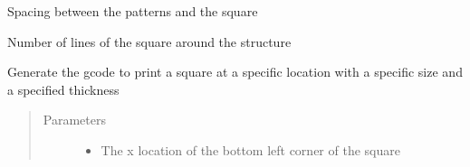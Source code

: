 \documentclass[letterpaper,10pt,english]{sphinxmanual}
\begin{document}
\begin{fulllineitems}
\begin{fulllineitems}
\end{fulllineitems}


\begin{fulllineitems}
\label{\detokenize{index:calibration_pattern.calibration_pattern.spacing_to_square}}
\sphinxAtStartPar
Spacing between the patterns and the square

\end{fulllineitems}


\begin{fulllineitems}
\label{\detokenize{index:calibration_pattern.calibration_pattern.square_lines}}
\sphinxAtStartPar
Number of lines of the square around the structure

\end{fulllineitems}


\begin{fulllineitems}
\label{\detokenize{index:calibration_pattern.calibration_pattern.square_pattern}}
\sphinxAtStartPar
Generate the gcode to print a square at a specific location with a specific size and a specified thickness
\begin{quote}\begin{description}
\item[{Parameters}] \leavevmode\begin{itemize}
\item {} 
\sphinxAtStartPar
{} \textendash{} The x location of the bottom left corner of the square


\end{itemize}
\end{description}
\end{quote}
\end{fulllineitems}
\end{fulllineitems}
\end{document}
